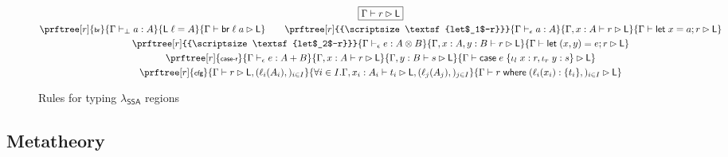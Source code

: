 \documentclass[acmsmall,screen,review]{acmart}
\newcommand{\ms}[1]{\ensuremath{\mathsf{#1}}}
\newcommand{\lto}{:}
\newcommand{\linl}[1]{\iota_l\;{#1}}
\newcommand{\linr}[1]{\iota_r\;{#1}}
\newcommand{\letstmt}[3]{\ensuremath{\ms{let}\;#1 = #2; #3}}
\newcommand{\brb}[2]{\ms{br}\;#1\;#2}
\newcommand{\casestmt}[5]{\ms{case}\;#1\;\{\linl{#2} \lto #3, \linr{#4} \lto #5\}}
\newcommand{\where}[2]{#1\;\ms{where}\;#2}
\newcommand{\wbranch}[3]{#1(#2) \lto \{#3\}}
\newcommand{\bhyp}[2]{#1 : #2}
\newcommand{\lhyp}[2]{#1(#2)}
\newcommand{\rle}[1]{{\scriptsize\textsf{#1}}}
\newcommand{\hasty}[4]{#1 \vdash_{#2} #3: {#4}}
\newcommand{\haslb}[3]{#1 \vdash #2 \rhd #3}
\newcommand{\isotopessa}{\(\lambda_{\ms{SSA}}\)}
\begin{document}
\begin{figure}
  \begin{gather*}
    \boxed{\haslb{\Gamma}{r}{\ms{L}}} \\
    \prftree[r]{\rle{br}}{\hasty{\Gamma}{\bot}{a}{A}}{\ms{L}\;\ell = A}
      {\haslb{\Gamma}{\brb{\ell}{a}}{\ms{L}}} \qquad
    \prftree[r]{\rle{let$_1$-r}}
      {\hasty{\Gamma}{\epsilon}{a}{A}}
      {\haslb{\Gamma, \bhyp{x}{A}}{r}{\ms{L}}}
      {\haslb{\Gamma}{\letstmt{x}{a}{r}}{\ms{L}}} \\
    \prftree[r]{\rle{let$_2$-r}}
      {\hasty{\Gamma}{\epsilon}{e}{A \otimes B}}
      {\haslb{\Gamma, \bhyp{x}{A}, \bhyp{y}{B}}{r}{\ms{L}}}
      {\haslb{\Gamma}{\letstmt{(x, y)}{e}{r}}{\ms{L}}} \\
    \prftree[r]{\rle{case-r}}
      {\hasty{\Gamma}{\epsilon}{e}{A + B}}
      {\haslb{\Gamma, \bhyp{x}{A}}{r}{\ms{L}}}
      {\haslb{\Gamma, \bhyp{y}{B}}{s}{\ms{L}}}
      {\haslb{\Gamma}{\casestmt{e}{x}{r}{y}{s}}{\ms{L}}} \\
    \prftree[r]{\rle{cfg}}
      {\haslb{\Gamma}{r}{\ms{L}, (\lhyp{\ell_i}{A_i},)_{i \in I}}}
      {\forall i \in I. \haslb{\Gamma, \bhyp{x_i}{A_i}}{t_i}{\ms{L}, (\lhyp{\ell_j}{A_j},)_{j \in I}}}
      {\haslb{\Gamma}{\where{r}{(\wbranch{\ell_i}{x_i}{t_i},)_{i \in I}}}{\ms{L}}}
  \end{gather*}
  \caption{Rules for typing \isotopessa{} regions}
  \Description{}
  \label{fig:ssa-reg-rules}
\end{figure}

\subsection{Metatheory}
\end{document}
